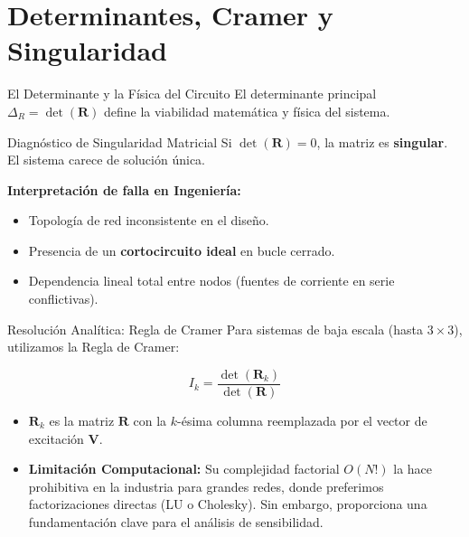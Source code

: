\documentclass[aspectratio=169]{beamer}
\begin{document}
\section{Determinantes, Cramer y Singularidad}
\begin{frame}{El Determinante y la Física del Circuito}
    El determinante principal $\Delta_R = \det(\mathbf{R})$ define la viabilidad matemática y física del sistema.
    
    \vspace{0.5cm}
    \begin{alertblock}{Diagnóstico de Singularidad Matricial}
        Si $\det(\mathbf{R}) = 0$, la matriz es \textbf{singular}. El sistema carece de solución única.
    \end{alertblock}
    
    \vspace{0.2cm}
    \textbf{Interpretación de falla en Ingeniería:}
    \begin{itemize}
        \item Topología de red inconsistente en el diseño.
        \item Presencia de un \textbf{cortocircuito ideal} en bucle cerrado.
        \item Dependencia lineal total entre nodos (fuentes de corriente en serie conflictivas).
    \end{itemize}
\end{frame}

\begin{frame}{Resolución Analítica: Regla de Cramer}
    Para sistemas de baja escala (hasta $3\times3$), utilizamos la Regla de Cramer:
    
    \begin{equation}
        I_k = \frac{\det(\mathbf{R}_k)}{\det(\mathbf{R})}
    \end{equation}
    
    \begin{itemize}
        \item $\mathbf{R}_k$ es la matriz $\mathbf{R}$ con la $k$-ésima columna reemplazada por el vector de excitación $\mathbf{V}$.
        \item \textbf{Limitación Computacional:} Su complejidad factorial $O(N!)$ la hace prohibitiva en la industria para grandes redes, donde preferimos factorizaciones directas (LU o Cholesky). Sin embargo, proporciona una fundamentación clave para el análisis de sensibilidad.
    \end{itemize}
\end{frame}
\end{document}
